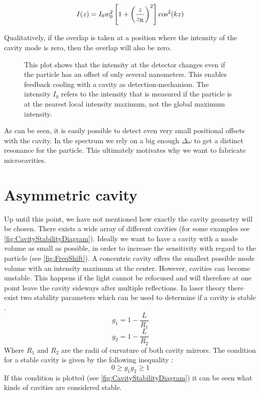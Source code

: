 \begin{equation}
	I(z)=I_0w_0^2\left[1+\left(\frac{z}{\de{z}{R}}\right)^2\right]\cos^2(kz)
\end{equation}

Qualitatively, if the overlap is taken at a position where the intensity of the cavity mode is zero, then the overlap will also be zero.

\begin{figure}[H]
	
	\caption{This plot shows that the intensity at the detector changes even if the particle has an offset of only several nanometers. This enables feedback cooling with a cavity as detection-mechanism. The intensity $I_0$ refers to the intensity that is measured if the particle is at the nearest local intensity maximum, not the global maximum intensity.}
\end{figure}

As can be seen, it is easily possible to detect even very small positional offsets with the cavity. In the spectrum we rely on a big enough $\Delta\omega$ to get a distinct resonance for the particle. This ultimately motivates why we want to fabricate microcavities.\\

\section{Asymmetric cavity}\label{ChapCavityStability}
Up until this point, we have not mentioned how exactly the cavity geometry will be chosen. There exists a wide array of different cavities (for some examples see \autoref{fig:CavityStabilityDiagram}). Ideally we want to have a cavity with a mode volume as small as possible, in order to increase the sensitivity with regard to the particle (see \autoref{fig:FreqShift}). A concentric cavity offers the smallest possible mode volume with an intensity maximum at the center. However, cavities can become unstable. This happens if the light cannot be refocused and will therefore at one point leave the cavity sideways after multiple reflections. In laser theory there exist two stability parameters which can be used to determine if a cavity is stable \cite[p.~746]{siegman1986lasers}.
\begin{equation}
	g_1=1-\frac{L}{R_1}
\end{equation}
\begin{equation}
	g_2=1-\frac{L}{R_2}
\end{equation}
Where $R_1$ and $R_2$ are the radii of curvature of both cavity mirrors. The condition for a stable cavity is given by the following inequality \cite[p.~747]{siegman1986lasers}:
\begin{equation}
	0\geq g_1g_2\geq 1
\end{equation}
If this condition is plotted (see \autoref{fig:CavityStabilityDiagram}) it can be seen what kinds of cavities are considered stable.

